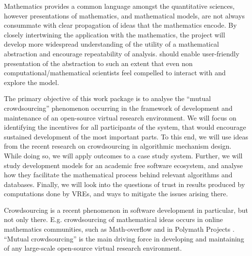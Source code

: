\begin{workpackage}[id=social-aspects,wphases=0-48,
  title=Social Aspects,
  lead=UO,
  UORM=53,USHRM=8, USORM=6]
\begin{wpobjectives}




Mathematics provides a common language amongst the quantitative
sciences, however presentations of mathematics, and mathematical
models, are not always consummate with clear propagation of ideas that
the mathematics encode. By closely intertwining the application with
the mathematics, the project will develop more widespread
understanding of the utility of a mathematical abstraction and
encourage repeatability of analysis. \TheProject should enable
user-friendly presentation of the abstraction to such an extent that
even non computational/mathematical scientists feel compelled to
interact with and explore the model.

The primary objective of this work package is to analyse the ``mutual
crowdsourcing'' phenomenon occurring in the framework of development
and maintenance of an open-source virtual research environment.  We
will focus on identifying the incentives for all participants of the
system, that would encourage sustained development of the most
important parts.  To this end, we will use ideas from the recent
research on crowdsourcing in algorithmic mechanism design.  While
doing so, we will apply outcomes to a case study system.  Further, we
will study development models for an academic free software ecosystem,
and analyse how they facilitate the mathematical process behind
relevant algorithms and databases.  Finally, we will look into the
questions of trust in results produced by computations done by VREs,
and ways to mitigate the issues arising there.

\end{wpobjectives}

\begin{wpdescription}
Crowdsourcing is a recent phenomenon in software development in
particular, but not only there. E.g.  crowdsourcing of mathematical
ideas occurs in online mathematics communities, such as Math-overflow
\cite{mathoverflow} and in Polymath Projects \cite{polymath_SIAM, PolymathBlog}.
``Mutual crowdsourcing'' is the main driving force in developing and
maintaining of any large-scale open-source virtual research
environment.


\end{wpdescription}
\end{workpackage}
